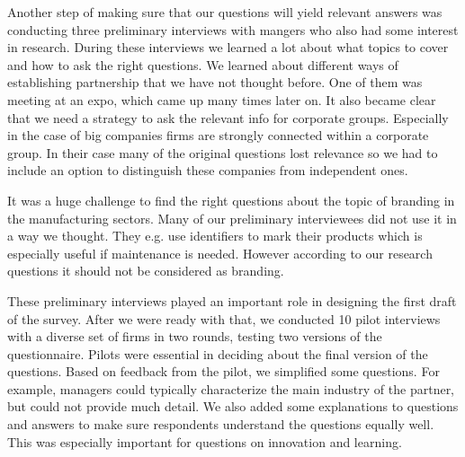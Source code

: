 \documentclass[final, dvipsnames, authoryear,12pt]{elsarticle}
\begin{document}
Another step of making sure that our questions will yield relevant answers was conducting three preliminary interviews with mangers who also had some interest in research. During these interviews we learned a lot about what topics to cover and how to ask the right questions. We learned about different ways of establishing partnership that we have not thought before. One of them was meeting at an expo, which came up many times later on. It also became clear that we need a strategy to ask the relevant info for corporate groups. Especially in the case of big companies firms are strongly connected within a corporate group. In their case many of the original questions lost relevance so we had to include an option to distinguish these companies from independent ones.




It was a huge challenge to find the right questions about the topic of branding in the manufacturing sectors. Many of our preliminary interviewees did not use it in a way we thought. They e.g. use identifiers to mark their products which is especially useful if maintenance is needed. However according to our research questions it should not be considered as branding.

These preliminary interviews played an important role in designing the first draft of the survey. After we were ready with that, we conducted 10 pilot interviews with a diverse set of firms in two rounds, testing two versions of the questionnaire. Pilots were essential in deciding about the final version of the questions. Based on feedback from the pilot, we simplified some questions. For example, managers could typically characterize the main industry of the partner, but could not provide much detail. We also added some explanations to questions and answers to make sure respondents understand the questions equally well. This was especially important for questions on innovation and learning. 
\end{document}
